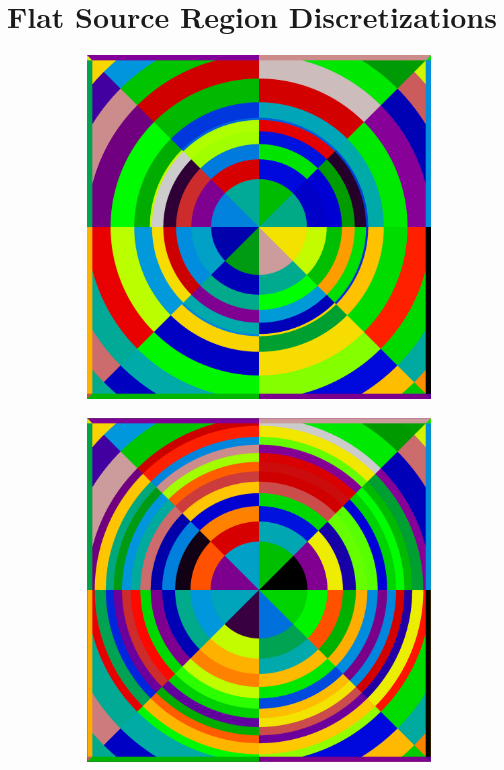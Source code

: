 \section{Flat Source Region Discretizations}
\label{sec:chap8-fsr-discretizations}

\begin{figure}[h!]
\centering
\begin{subfigure}{.5\textwidth}
  \centering
  \includegraphics[width=0.9\linewidth]{figures/quantification/fsrs-fuel-pin}
  \caption{}
  \label{fig:chap8-pin-1.6}
\end{subfigure}%
\begin{subfigure}{.5\textwidth}
  \centering
  \includegraphics[width=0.9\linewidth]{figures/quantification/fsrs-crgt}

\end{subfigure}
\end{figure}
